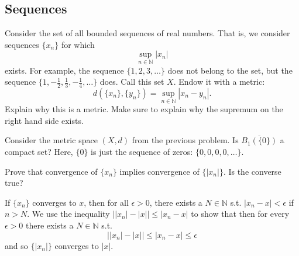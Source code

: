 \subsection{Sequences}

  \begin{exercise}
    Consider the set of all bounded sequences of real numbers. That is, we
    consider sequences $\{x_n\}$ for which
    \begin{equation}
      \sup_{n\in\mathbb{N}} |x_n|
    \end{equation}
    exists. For example, the sequence $\{1,2,3,\ldots\}$ does not belong to the set,
    but the sequence $\{1,-\frac{1}{2},\frac{1}{3},-\frac{1}{4},\ldots\}$ does. Call this set $X$. Endow it with
    a metric:
    \begin{equation}
      d(\{x_n\},\{y_n\}) = \sup_{n\in\mathbb{N}} |x_n - y_n|.
    \end{equation}
    Explain why this is a metric. Make sure to explain why the supremum on
    the right hand side exists.
  \end{exercise}
  \begin{solution}
    
  \end{solution}

  \begin{exercise}
    Consider the metric space $(X,d)$ from the previous problem. Is $\overline{B_1(\{0\})}$
    a compact set? Here, $\{0\}$ is just the sequence of zeros: $\{0,0,0,0,\ldots\}$.
  \end{exercise}
  \begin{solution}
    
  \end{solution}
  
  \begin{exercise}[Rudin 3.1]
    Prove that convergence of $\{x_n\}$ implies convergence of $\{|x_n|\}$. Is the converse true? 
  \end{exercise}
  \begin{solution}
    If $\{x_n\}$ converges to $x$, then for all $\epsilon > 0$, there exists a $N \in \mathbb{N}$ s.t. $|x_n - x| < \epsilon$ if $n > N$. We use the inequality $\big| |x_n| - |x| \big| \leq |x_n - x|$ to show that then for every $\epsilon > 0$ there exists a $N \in \mathbb{N}$ s.t. 
    \[ \big| |x_n| - |x| \big| \leq |x_n - x| \leq \epsilon \]
    and so $\{|x_n|\}$ converges to $|x|$. 
  \end{solution}

